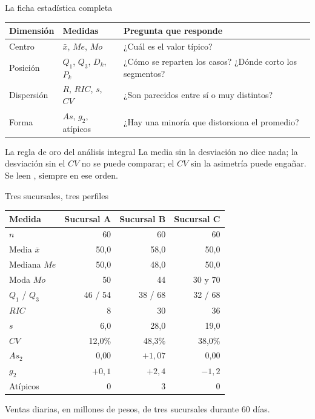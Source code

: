 \documentclass[aspectratio=169,10pt]{beamer}
\begin{document}

\begin{frame}{La ficha estadística completa}
  \scriptsize
  \begin{center}
  \begin{tabular}{@{}p{2.2cm}p{3.4cm}p{5.8cm}@{}}
    \toprule
    \textbf{Dimensión} & \textbf{Medidas} & \textbf{Pregunta que responde} \\
    \midrule
    Centro & $\bar{x}$, $Me$, $Mo$ &
      ¿Cuál es el valor típico? \\
    \addlinespace
    Posición & $Q_1$, $Q_3$, $D_k$, $P_k$ &
      ¿Cómo se reparten los casos? ¿Dónde corto los segmentos? \\
    \addlinespace
    Dispersión & $R$, $RIC$, $s$, $CV$ &
      ¿Son parecidos entre sí o muy distintos? \\
    \addlinespace
    Forma & $As$, $g_2$, atípicos &
      ¿Hay una minoría que distorsiona el promedio? \\
    \bottomrule
  \end{tabular}
  \end{center}

  \vspace{0.1cm}
  \begin{alertblock}{La regla de oro del análisis integral}
    \scriptsize
     La media sin la desviación no
    dice nada; la desviación sin el $CV$ no se puede comparar; el $CV$ sin la
    asimetría puede engañar. Se leen ,
    siempre en ese orden.
  \end{alertblock}
\end{frame}

\begin{frame}{Tres sucursales, tres perfiles}
  \scriptsize
  \begin{center}
  \begin{tabular}{@{}lrrr@{}}
    \toprule
    \textbf{Medida} & \textbf{Sucursal A} & \textbf{Sucursal B} &
    \textbf{Sucursal C} \\
    \midrule
    $n$ & 60 & 60 & 60 \\
    Media $\bar{x}$ & 50{,}0 & 58{,}0 & 50{,}0 \\
    Mediana $Me$ & 50{,}0 & 48{,}0 & 50{,}0 \\
    Moda $Mo$ & 50 & 44 & 30 y 70 \\
    $Q_1$ / $Q_3$ & 46 / 54 & 38 / 68 & 32 / 68 \\
    $RIC$ & 8 & 30 & 36 \\
    $s$ & 6{,}0 & 28{,}0 & 19{,}0 \\
    $CV$ & 12{,}0\% & 48{,}3\% & 38{,}0\% \\
    $As_2$ & 0{,}00 & $+1{,}07$ & 0{,}00 \\
    $g_2$ & $+0{,}1$ & $+2{,}4$ & $-1{,}2$ \\
    Atípicos & 0 & 3 & 0 \\
    \bottomrule
  \end{tabular}
  \end{center}
  {\tiny\color{uniGris} Ventas diarias, en millones de pesos, de tres
  sucursales durante 60 días.}
\end{frame}
\end{document}
